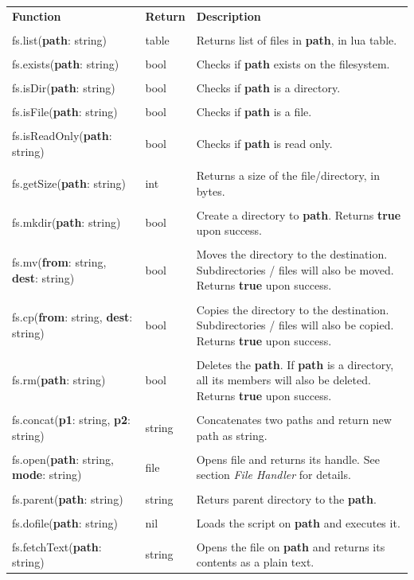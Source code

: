 \documentclass[10pt, stock]{memoir}
\begin{document}
\begin{tabularx}{\textwidth}{l l X}
	\textbf{\large Function} & \textbf{\large Return} & \textbf{\large Description}
	\\ \\
	\endhead
	fs.list(\textbf{path}: string) & table & Returns list of files in \textbf{path}, in lua table.
	\\ \\
	fs.exists(\textbf{path}: string) & bool & Checks if \textbf{path} exists on the filesystem.
	\\ \\
	fs.isDir(\textbf{path}: string) & bool & Checks if \textbf{path} is a directory.
	\\ \\
	fs.isFile(\textbf{path}: string) & bool & Checks if \textbf{path} is a file.
	\\ \\
	fs.isReadOnly(\textbf{path}: string) & bool & Checks if \textbf{path} is read only.
	\\ \\
	fs.getSize(\textbf{path}: string) & int & Returns a size of the file/directory, in bytes.
	\\ \\
	fs.mkdir(\textbf{path}: string) & bool & Create a directory to \textbf{path}. Returns \textbf{true} upon success.
	\\ \\
	fs.mv(\textbf{from}: string, \textbf{dest}: string) & bool & Moves the directory to the destination. Subdirectories / files will also be moved. Returns \textbf{true} upon success.
	\\ \\
	fs.cp(\textbf{from}: string, \textbf{dest}: string) & bool & Copies the directory to the destination. Subdirectories / files will also be copied. Returns \textbf{true} upon success.
	\\ \\
	fs.rm(\textbf{path}: string) & bool & Deletes the \textbf{path}. If \textbf{path} is a directory, all its members will also be deleted. Returns \textbf{true} upon success.
	\\ \\
	fs.concat(\textbf{p1}: string, \textbf{p2}: string) & string & Concatenates two paths and return new path as string.
	\\ \\
	fs.open(\textbf{path}: string, \textbf{mode}: string) & file & Opens file and returns its handle. See section \emph{File Handler} for details.
	\\ \\
	fs.parent(\textbf{path}: string) & string & Returs parent directory to the \textbf{path}.
	\\ \\
	fs.dofile(\textbf{path}: string) & nil & Loads the script on \textbf{path} and executes it.
	\\ \\
	fs.fetchText(\textbf{path}: string) & string & Opens the file on \textbf{path} and returns its contents as a plain text.
\end{tabularx}
\end{document}
